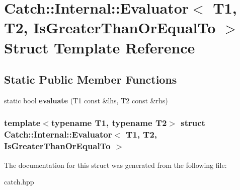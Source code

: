\hypertarget{structCatch_1_1Internal_1_1Evaluator_3_01T1_00_01T2_00_01IsGreaterThanOrEqualTo_01_4}{
\section{Catch::Internal::Evaluator$<$ T1, T2, IsGreaterThanOrEqualTo $>$ Struct Template Reference}
\label{structCatch_1_1Internal_1_1Evaluator_3_01T1_00_01T2_00_01IsGreaterThanOrEqualTo_01_4}
}
\subsection*{Static Public Member Functions}
\begin{DoxyCompactItemize}
\item 
\hypertarget{structCatch_1_1Internal_1_1Evaluator_3_01T1_00_01T2_00_01IsGreaterThanOrEqualTo_01_4_a5ba107c6da4292b6492a0e5e906f9484}{
static bool {\bfseries evaluate} (T1 const \&lhs, T2 const \&rhs)}
\label{structCatch_1_1Internal_1_1Evaluator_3_01T1_00_01T2_00_01IsGreaterThanOrEqualTo_01_4_a5ba107c6da4292b6492a0e5e906f9484}

\end{DoxyCompactItemize}
\subsubsection*{template$<$typename T1, typename T2$>$ struct Catch::Internal::Evaluator$<$ T1, T2, IsGreaterThanOrEqualTo $>$}



The documentation for this struct was generated from the following file:\begin{DoxyCompactItemize}
\item 
catch.hpp\end{DoxyCompactItemize}

